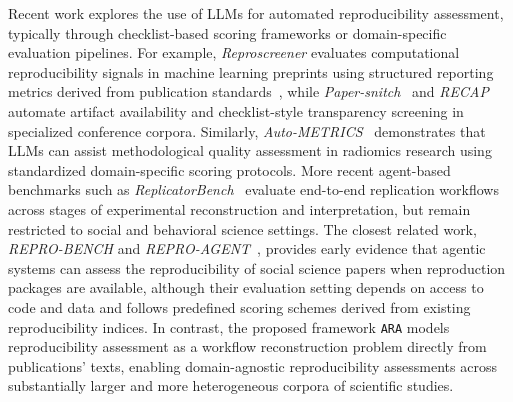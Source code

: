 \documentclass{article}
\begin{document}
Recent work explores the use of LLMs for automated reproducibility assessment, typically through checklist-based scoring frameworks or domain-specific evaluation pipelines. 
For example, \textit{Reproscreener} evaluates computational reproducibility signals in machine learning preprints using structured reporting metrics derived from publication standards~\citep{bhaskar2024reproscreener}, while \textit{Paper-snitch}~\citep{santoli2024} and \textit{RECAP}~\citep{da2026assessing} automate artifact availability and checklist-style transparency screening in specialized conference corpora. 
Similarly, \textit{Auto-METRICS}~\citep{de2025auto} demonstrates that LLMs can assist methodological quality assessment in radiomics research using standardized domain-specific scoring protocols. 
More recent agent-based benchmarks such as \textit{ReplicatorBench}~\citep{nguyen2026replicatorbench} evaluate end-to-end replication workflows across stages of experimental reconstruction and interpretation, but remain restricted to social and behavioral science settings. 
The closest related work, \textit{REPRO-BENCH} and \textit{REPRO-AGENT}~\citep{hu2025repro}, provides early evidence that agentic systems can assess the reproducibility of social science papers when reproduction packages are available, although their evaluation setting depends on access to code and data and follows predefined scoring schemes derived from existing reproducibility indices. 
In contrast, the proposed framework \texttt{ARA} models reproducibility assessment as a workflow reconstruction problem directly from publications' texts, enabling domain-agnostic reproducibility assessments across substantially larger and more heterogeneous corpora of scientific studies.
\end{document}
